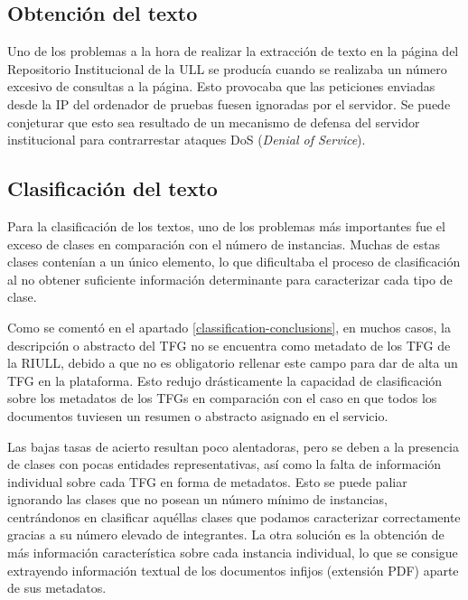 \lhead{\emph{\ChapterThree{}}}
\subsection{Obtención del texto}

Uno de los problemas a la hora de realizar la extracción de texto en la página del Repositorio Institucional de la ULL se producía cuando se realizaba un número excesivo de consultas a la página. Esto provocaba que las peticiones enviadas desde la IP del ordenador de pruebas fuesen ignoradas por el servidor. Se puede conjeturar que esto sea resultado de un mecanismo de defensa del servidor institucional para contrarrestar ataques DoS (\textit{Denial of Service}). 

\subsection{Clasificación del texto}

Para la clasificación de los textos, uno de los problemas más importantes fue el exceso de clases en comparación con el número de instancias. Muchas de estas clases contenían a un único elemento, lo que dificultaba el proceso de clasificación al no obtener suficiente información determinante para caracterizar cada tipo de clase.

Como se comentó en el apartado \ref{classification-conclusions}, en muchos casos, la descripción o abstracto del TFG no se encuentra como metadato de los TFG de la RIULL, debido a que no es obligatorio rellenar este campo para dar de alta un TFG en la plataforma.
%
Esto redujo drásticamente la capacidad de clasificación sobre los metadatos de los TFGs en comparación con el caso en que todos los documentos tuviesen un resumen o abstracto asignado en el servicio.

Las bajas tasas de acierto resultan poco alentadoras, pero se deben a la presencia de clases con pocas entidades representativas, así como la falta de información individual sobre cada TFG en forma de metadatos. Esto se puede paliar ignorando las clases que no posean un número mínimo de instancias, centrándonos en clasificar aquéllas clases que podamos caracterizar correctamente gracias a su número elevado de integrantes. 
%
La otra solución es la obtención de más información característica sobre cada instancia individual, lo que se consigue extrayendo información textual de los documentos infijos (extensión PDF) aparte de sus metadatos.


